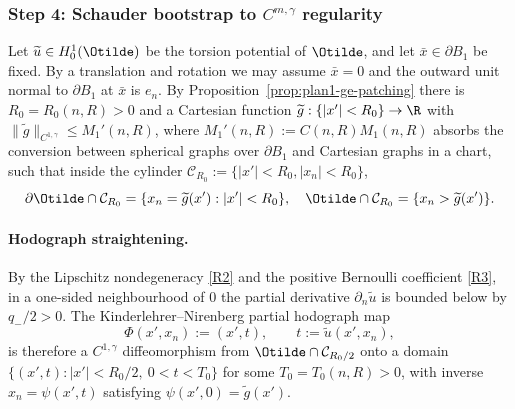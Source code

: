 \subsubsection{Step 4: Schauder bootstrap to \(C^{m,\gamma}\) regularity}
\label{subsubsec:plan1-ge-S4}

Let \(\widetilde u\in H^1_0(\Otilde)\) be the torsion potential of
\(\Otilde\), and let \(\bar x\in\partial B_1\) be fixed. By a translation
and rotation we may assume \(\bar x=0\) and the outward unit normal to
\(\partial B_1\) at \(\bar x\) is \(e_n\). By
Proposition~\ref{prop:plan1-ge-patching} there is \(R_0=R_0(n,R)>0\) and a
Cartesian function \(\widetilde g:\{|x'|<R_0\}\to\R\) with
\(\|\widetilde g\|_{C^{1,\gamma}}\le M_1'(n,R)\), where
\(M_1'(n,R):=C(n,R)M_1(n,R)\) absorbs the conversion between spherical
graphs over \(\partial B_1\) and Cartesian graphs in a chart, such that
inside the cylinder
\(\mathcal C_{R_0}:=\{|x'|<R_0,|x_n|<R_0\}\),
\[
   \partial\Otilde\cap\mathcal C_{R_0}
   =\{x_n=\widetilde g(x'):|x'|<R_0\},\quad
   \Otilde\cap\mathcal C_{R_0}
   =\{x_n>\widetilde g(x')\}.
\]

\paragraph{Hodograph straightening.}
By the Lipschitz nondegeneracy \ref{R2} and the positive Bernoulli
coefficient \ref{R3}, in a one-sided neighbourhood of \(0\) the partial
derivative \(\partial_n\widetilde u\) is bounded below by \(q_-/2>0\).
The Kinderlehrer--Nirenberg partial hodograph map
\cite[\S 2]{KN1977}
\[
   \Phi(x',x_n):=(x',t),\qquad t:=\widetilde u(x',x_n),
\]
is therefore a \(C^{1,\gamma}\) diffeomorphism from
\(\Otilde\cap\mathcal C_{R_0/2}\) onto a domain
\(\{(x',t):|x'|<R_0/2,\ 0<t<T_0\}\) for some \(T_0=T_0(n,R)>0\), with
inverse \(x_n=\psi(x',t)\) satisfying \(\psi(x',0)=\widetilde g(x')\).


